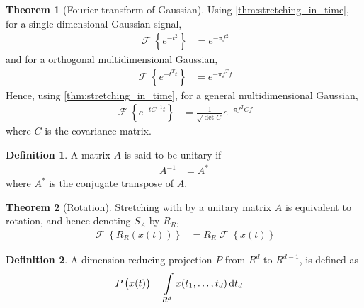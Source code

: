 \documentclass[titlepage, fleqn, a4paper, 12pt, twoside]{article}
\theoremstyle{definition}
\newtheorem{definition}{Definition}
\theoremstyle{theorem}
\newtheorem{theorem}{Theorem}
\DeclareMathOperator{\FT}{\mathcal{F}}
\begin{document}
\begin{theorem}[Fourier transform of Gaussian]
	Using \cref{thm:stretching_in_time}, for a single dimensional Gaussian signal,
	\begin{align*}
		\FT\left\{ e^{-t^2} \right\} &= e^{-\pi f^2}
	\end{align*}
	and for a orthogonal multidimensional Gaussian,
	\begin{align*}
		\FT\left\{ e^{-t^T t} \right\} &= e^{-\pi f^T f}
	\end{align*}
	Hence, using \cref{thm:stretching_in_time}, for a general multidimensional Gaussian,
	\begin{align*}
		\FT\left\{ e^{-t C^{-1} t} \right\} &= \frac{1}{\sqrt{\det C}} e^{-\pi f^T C f}
	\end{align*}
	where $C$ is the covariance matrix.
	\label{thm:Fourier_transform_of_Gaussian}
\end{theorem}

\begin{definition}
	A matrix $A$ is said to be unitary if
	\begin{align*}
		A^{-1} &= A^*
	\end{align*}
	where $A^*$ is the conjugate transpose of $A$.
\end{definition}

\begin{theorem}[Rotation]
	Stretching with by a unitary matrix $A$ is equivalent to rotation, and hence denoting $S_A$ by $R_R$,
	\begin{align*}
		\FT\left\{ R_R\left( x(t) \right) \right\} &= R_R \FT\left\{ x(t) \right\}
	\end{align*}
	\label{thm:rotation}
\end{theorem}

\begin{definition}
	A dimension-reducing projection $P$ from $R^d$ to $R^{d - 1}$, is defined as
	\begin{align*}
		P\left( x(t) \right) &= \int\limits_{R^d} x(t_1,\dots,t_d) \dif t_d
	\end{align*}
\end{definition}
\end{document}
